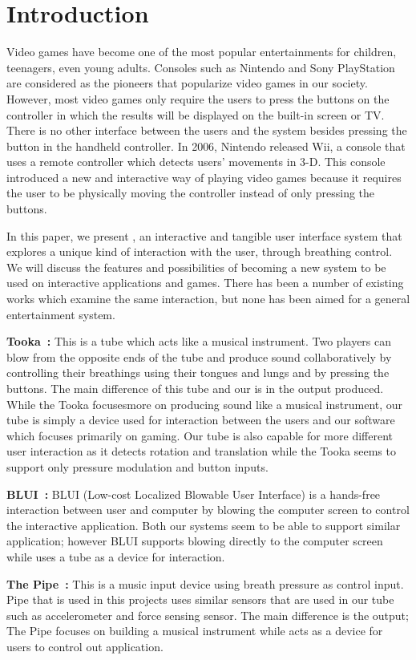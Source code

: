 \section{Introduction}\label{sec:intro}

Video games have become one of the most popular entertainments for children, teenagers, even young adults. Consoles such as Nintendo and Sony PlayStation are considered as the pioneers that popularize video games in our society. However, most video games only require the users to press the buttons on the controller in which the results will be displayed on the built-in screen or TV. There is no other interface between the users and the system besides pressing the button in the handheld controller. In 2006, Nintendo released Wii, a console that uses a remote controller which detects users’ movements in 3-D. This console introduced a new and interactive way of playing video games because it requires the user to be physically moving the controller instead of only pressing the buttons.

In this paper, we present \tube, an interactive and tangible user interface system that explores a unique kind of interaction with the user, \ie through breathing control. We will discuss the features and possibilities of \tube becoming a new system to be used on interactive applications and games. There has been a number of existing works which examine the same interaction, but none has been aimed for a general entertainment system.

\textbf{Tooka~\cite{tooka}:} This is a tube which acts like a musical instrument. Two players can blow from the opposite ends of the tube and produce sound collaboratively by controlling their breathings using their tongues and lungs and by pressing the buttons. The main difference of this tube and our \tube is in the output produced. While the Tooka focusesmore on producing sound like a musical instrument, our tube is simply a device used for interaction between the users and our software which focuses primarily on gaming. Our tube is also capable for more different user interaction as it detects rotation and translation while the Tooka seems to support only pressure modulation and button inputs.

\textbf{BLUI~\cite{blui}:} BLUI (Low-cost Localized Blowable User Interface) is a hands-free interaction between user and computer by blowing the computer screen to control the interactive application. Both our systems seem to be able to support similar application; however BLUI supports blowing directly to the computer screen while \tube uses a tube as a device for interaction.

\textbf{The Pipe~\cite{thepipe}:} This is a music input device using breath pressure as control input. Pipe that is used in this projects uses similar sensors that are used in our tube such as accelerometer and force sensing sensor. The main difference is the output; The Pipe focuses on building a musical instrument while \tube acts as a device for users to control out application.
